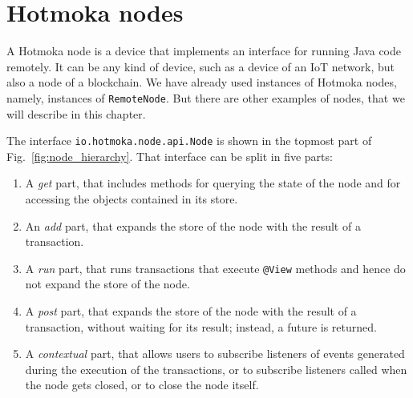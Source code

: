 \chapter{Hotmoka nodes}\label{ch:hotmoka_nodes}

A Hotmoka node is a device that implements an interface for running Java code
remotely. It can be any kind of device, such as a device of an IoT network,
but also a node of a blockchain. We have already used instances of Hotmoka nodes,
namely, instances of \texttt{RemoteNode}. But there are other examples of nodes, that we
will describe in this chapter.

The interface \texttt{io.hotmoka.node.api.Node}
is shown in the topmost part of Fig.~\ref{fig:node_hierarchy}.
That interface can be split in five parts:
%
\begin{enumerate}
\item A \emph{get} part, that includes methods for querying the
	state of the node and for accessing the objects contained in its store.
\item An \emph{add} part, that expands the store of the node with the result of a transaction.
\item A \emph{run} part, that runs transactions that execute
	\texttt{@View} methods and hence do not
   	expand the store of the node.
\item A \emph{post} part, that expands the store of the node with the result of a transaction,
	without waiting for its result; instead, a future is returned.
\item A \emph{contextual} part, that allows users to subscribe listeners of events generated during
	the execution of the transactions, or to subscribe listeners called when the node gets closed, or
	to close the node itself.
\end{enumerate}

